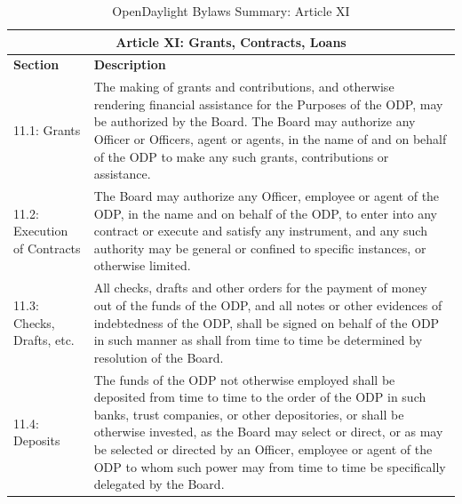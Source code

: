 \documentclass[a4paper, 12pt]{book}
\begin{document}
{\begin{table}[H]
  \begin{center}
    \begin{tabular}{ | p{4cm} | p{11cm} | }
    \toprule
    \multicolumn {2}{|c|}{\textbf{Article XI: Grants, Contracts, Loans}} \\
    \hline
    \textbf{Section} & \textbf{Description} \\
    \hline
    11.1: Grants & The making of grants and contributions, and otherwise rendering financial assistance for the Purposes of the ODP, may be authorized by the Board. The Board may authorize any Officer or Officers, agent or agents, in the name of and on behalf of the ODP to make any such grants, contributions or assistance.\\
    \hline
    11.2: Execution of Contracts & The Board may authorize any Officer, employee or agent of the ODP, in the name and on behalf of the ODP, to enter into any contract or execute and satisfy any instrument, and any such authority may be general or confined to specific instances, or otherwise limited.\\
    \hline
    11.3: Checks, Drafts, etc. & All checks, drafts and other orders for the payment of money out of the funds of the ODP, and all notes or other evidences of indebtedness of the ODP, shall be signed on behalf of the ODP in such manner as shall from time to time be determined by resolution of the Board.\\
    \hline
    11.4: Deposits & The funds of the ODP not otherwise employed shall be deposited from time to time to the order of the ODP in such banks, trust companies, or other depositories, or shall be otherwise invested, as the Board may select or direct, or as may be selected or directed by an Officer, employee or agent of the ODP to whom such power may from time to time be specifically delegated by the Board.\\
    \bottomrule
    \end{tabular}
    \caption{OpenDaylight Bylaws Summary: Article XI}
    \label{tab:odlbylaws-art11}
  \end{center}
\end{table}

}
\end{document}
